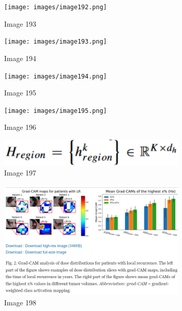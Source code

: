 \documentclass{article}%
\begin{document}
%


\begin{figure}[h!]%
\centering%
\texttt{[image: images/image192.png]}%
\caption{Image 193}%
\end{figure}

%


\begin{figure}[h!]%
\centering%
\texttt{[image: images/image193.png]}%
\caption{Image 194}%
\end{figure}

%


\begin{figure}[h!]%
\centering%
\texttt{[image: images/image194.png]}%
\caption{Image 195}%
\end{figure}

%


\begin{figure}[h!]%
\centering%
\texttt{[image: images/image195.png]}%
\caption{Image 196}%
\end{figure}

%


\begin{figure}[h!]%
\centering%
\includegraphics[width=0.8\textwidth]{images/image196.png}%
\caption{Image 197}%
\end{figure}

%


\begin{figure}[h!]%
\centering%
\includegraphics[width=0.8\textwidth]{images/image197.png}%
\caption{Image 198}%
\end{figure}

%
\end{document}
